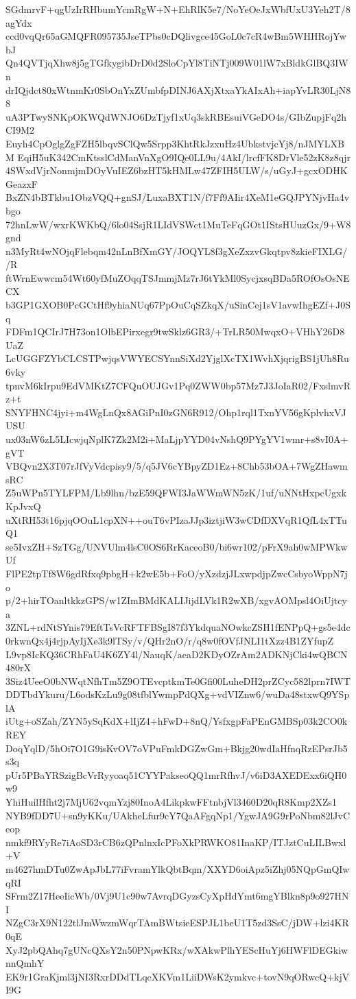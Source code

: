 SGdmrvF+qgUzIrRHbumYcmRgW+N+EhRlK5e7/NoYeOeJxWbfUxU3Yeh2T/8agYdx
ccd0vqQr65aGMQFR095735JseTPbs0cDQlivgce45GoL0c7cR4wBm5WHHRojYwbJ
Qn4QVTjqXhw8j5gTGfkygibDrD0d2SloCpYl8TiNTj009W01lW7xBldkGlBQ3IWn
drIQjdct80xWtnmKr0SbOnYxZUmbfpDINJ6AXjXtxaYkAIxAh+iapYvLR30LjN88
uA3PTwySNKpOKWQdWNJO6DzTjyf1xUq3skRBEsuiVGeDO4s/GIbZupjFq2hCI9M2
Euyh4CpOglgZgFZH5lbqvSClQw5Srpp3KhtRkJzxuHz4UbkstvjcYj8/nJMYLXBM
EqiH5uK342CmKtsslCdManVnXgO9IQe0LL9u/4AkI/lrcfFK8DrVle52zK8z8qjr
4SWxdVjrNonmjmDOyVuIEZ6bzHT5kHMLw47ZFIH5ULW/s/uGyJ+gcxODHKGeazxF
BxZN4bBTkbu1ObzVQQ+gnSJ/LuxaBXT1N/f7Ff9AIir4XeM1eGQJPYNjvHa4vbgo
72hnLwW/wxrKWKbQ/6lo04SsjR1LIdVSWct1MuTeFqGOt1IStsHUuzGx/9+W8gnd
n3MyRt4wNOjqFlebqm42nLnBfXmGY/JOQYL8f3gXeZxzvGkqtpv8zkieFIXLG//R
ftWrnEwwcm54Wt60yfMuZOqqTSJmmjMz7rJ6tYkMl0SycjxsqBDa5ROfOsOsNECX
b3GP1GXOB0PcGCtHf9yhiaNUq67PpOuCqSZkqX/uSinCej1sV1avwIhgEZf+J0Sq
FDFm1QCIrJ7H73on1OlbEPirxegr9twSklz6GR3/+TrLR50MwqxO+VHhY26D8UaZ
LcUGGFZYbCLCSTPwjqsVWYECSYnnSiXd2YjglXcTX1WvhXjqrigBS1jUh8Ru6vky
tpnvM6kIrpu9EdVMKtZ7CFQuOUJGv1Pq0ZWW0bp57Mz7J3JoIaR02/FxslmvRz+t
SNYFHNC4jyi+m4WgLnQx8AGiPnI0zGN6R912/Ohp1rql1TxnYV56gKplvhxVJUSU
ux03nW6zL5LIcwjqNplK7Zk2M2i+MaLjpYYD04vNshQ9PYgYV1wmr+s8vI0A+gVT
VBQvn2X3T07rJfVyVdcpisy9/5/q5JV6cYBpyZD1Ez+8Chb53bOA+7WgZHawmsRC
Z5uWPn5TYLFPM/Lb9lhn/bzE59QFWI3JaWWmWN5zK/1uf/uNNtHxpcUgxkKpJvxQ
uXtRH53t16pjqOOuL1cpXN++ouT6vPIzaJJp3iztjiW3wCDfDXVqR1QfL4xTTuQ1
se5IvxZH+SzTGg/UNVUlm4lsC0OS6RrKaceoB0/bi6wr102/pFrX9ah0wMPWkwUf
FlPE2tpTf8W6gdRfxq9pbgH+k2wE5b+FoO/yXzdzjJLxwpdjpZwcCsbyoWppN7jo
p/2+hirTOanltkkzGPS/w1ZImBMdKALIJijdLVk1R2wXB/xgvAOMpsl4OiUjtcya
3ZNL+rdNtSYnis79EftTsVcRFTFBSgI87f3YkdquaNOwkcZSH1fENPpQ+gs5e4dc
0rkwnQx4j4rjpAyIjXe3k9lTSy/v/QHr2nO/r/q8w0fOVfJNLI1tXzz4B1ZYfupZ
L9vp8IcKQ36CRhFaU4K6ZY4l/NauqK/aeaD2KDyOZrAm2ADKNjCki4wQBCN480rX
3Siz4UeeO0bNWqtNfhTm5Z9OTEvcptkmTe0Gfi00LuheDH2prZCyc582lprn7IWT
DDTbdYkuru/L6odsKzLu9g08tfblYwmpPdQXg+vdVIZnw6/wuDa48stxwQ9YSplA
iUtg+oSZah/ZYN5ySqKdX+lIjZ4+hFwD+8nQ/YsfxgpFaPEnGMBSp03k2CO0kREY
DoqYqlD/5hOi7O1G9isKvOV7oVPuFmkDGZwGm+Bkjg20wdIaHfnqRzEPsrJb5s3q
pUr5PBaYRSzigBcVrRyyoaq51CYYPakseoQQ1mrRfhvJ/v6iD3AXEDExx6iQH0w9
YhiHuilHfht2j7MjU62vqmYzj80InoA4LikpkwFFtnbjVl3460D20qR8Kmp2XZs1
NYB9fDD7U+sn9yKKu/UAkheLfur9cY7QaAFgqNp1/YgwJA9G9rPoNbm82lJvCeop
nmkf9RYyRe7iAoSD3rCB6zQPnlnxIcPFoXkPRWKO81InaKP/ITJztCuLILBwxl+V
m4627hmDTu0ZwApJbL77iFvramYlkQbtBqm/XXYD6oiApz5iZhj05NQpGmQIwqRI
SFrm2Z17HeeIicWb/0Vj9U1c90w7AvrqDGyzsCyXpHdYmt6mgYBlkn8p9o927HNI
NZgC3rX9N122tlJmWwzmWqrTAmBWtsieESPJL1beU1T5zd3SsC/jDW+lzi4KR0qE
XyJ2pbQAhq7gUNcQXsY2n50PNpwKRx/wXAkwPlhYEScHuYj6HWFlDEGkiwnnQmhY
EK9r1GraKjml3jNI3RxrDDdTLqcXKVm1LiiDWsK2ymkvc+tovN9qORwcQ+kjVI9G

